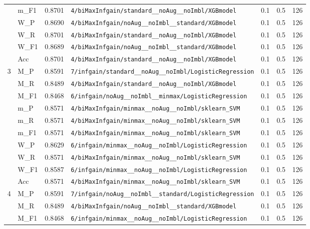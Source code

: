 \begin{table}[htbp]
\begin{tabular}{|c|l|c|>{\ttfamily\footnotesize}p{7.2cm}|c|c|c|}
 & m\_F1 & 0.8701 & \texttt{4/biMaxInfgain/standard\_\_noAug\_\_noImbl/XGBmodel} & 0.1 & 0.5  & 126 \\ 
 & W\_P & 0.8690 & \texttt{4/biMaxInfgain/noAug\_\_noImbl\_\_standard/XGBmodel} & 0.1 & 0.5  & 126 \\ 
 & W\_R & 0.8701 & \texttt{4/biMaxInfgain/standard\_\_noAug\_\_noImbl/XGBmodel} & 0.1 & 0.5  & 126 \\ 
 & W\_F1 & 0.8689 & \texttt{4/biMaxInfgain/noAug\_\_noImbl\_\_standard/XGBmodel} & 0.1 & 0.5  & 126 \\ 
 & Acc & 0.8701 & \texttt{4/biMaxInfgain/standard\_\_noAug\_\_noImbl/XGBmodel} & 0.1 & 0.5  & 126 \\ 
\hline
\multirow{10}{*}{3} & M\_P & 0.8591 & \texttt{7/infgain/standard\_\_noAug\_\_noImbl/LogisticRegression} & 0.1 & 0.5  & 126 \\ 
 & M\_R & 0.8489 & \texttt{4/biMaxInfgain/standard\_\_noAug\_\_noImbl/XGBmodel} & 0.1 & 0.5  & 126 \\ 
 & M\_F1 & 0.8468 & \texttt{6/infgain/noAug\_\_noImbl\_\_minmax/LogisticRegression} & 0.1 & 0.5  & 126 \\ 
 & m\_P & 0.8571 & \texttt{4/biMaxInfgain/minmax\_\_noAug\_\_noImbl/sklearn\_SVM} & 0.1 & 0.5  & 126 \\ 
 & m\_R & 0.8571 & \texttt{4/biMaxInfgain/minmax\_\_noAug\_\_noImbl/sklearn\_SVM} & 0.1 & 0.5  & 126 \\ 
 & m\_F1 & 0.8571 & \texttt{4/biMaxInfgain/minmax\_\_noAug\_\_noImbl/sklearn\_SVM} & 0.1 & 0.5  & 126 \\ 
 & W\_P & 0.8629 & \texttt{6/infgain/minmax\_\_noAug\_\_noImbl/LogisticRegression} & 0.1 & 0.5  & 126 \\ 
 & W\_R & 0.8571 & \texttt{4/biMaxInfgain/minmax\_\_noAug\_\_noImbl/sklearn\_SVM} & 0.1 & 0.5  & 126 \\ 
 & W\_F1 & 0.8587 & \texttt{6/infgain/minmax\_\_noAug\_\_noImbl/LogisticRegression} & 0.1 & 0.5  & 126 \\ 
 & Acc & 0.8571 & \texttt{4/biMaxInfgain/minmax\_\_noAug\_\_noImbl/sklearn\_SVM} & 0.1 & 0.5  & 126 \\ 
\hline
\multirow{10}{*}{4} & M\_P & 0.8591 & \texttt{7/infgain/noAug\_\_noImbl\_\_standard/LogisticRegression} & 0.1 & 0.5  & 126 \\ 
 & M\_R & 0.8489 & \texttt{4/biMaxInfgain/noAug\_\_noImbl\_\_standard/XGBmodel} & 0.1 & 0.5  & 126 \\ 
 & M\_F1 & 0.8468 & \texttt{6/infgain/minmax\_\_noAug\_\_noImbl/LogisticRegression} & 0.1 & 0.5  & 126 \\ 

\end{tabular}
\end{table}
